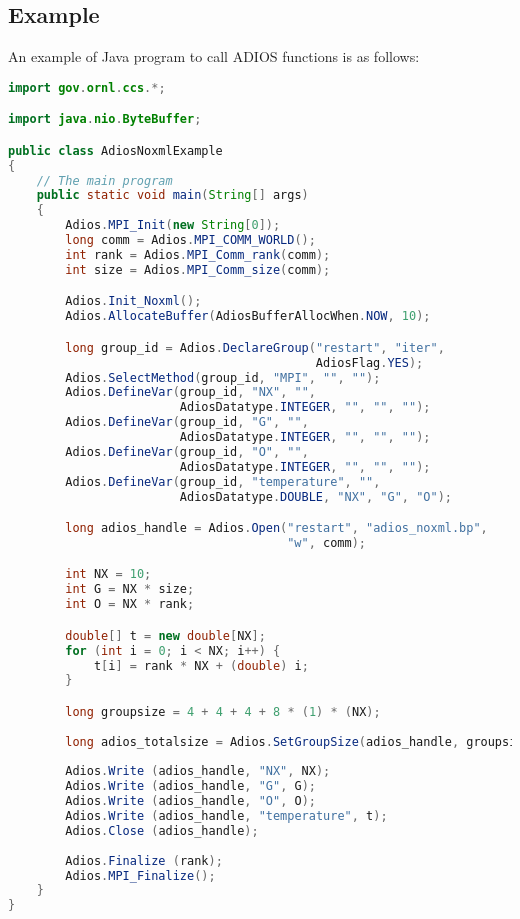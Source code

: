 \subsection{Example}
An example of Java program to call ADIOS functions is as follows:
\begin{lstlisting}[language=Java,frame=single, backgroundcolor=\color{gray85},caption={Example Java wrapper code},label={}]
import gov.ornl.ccs.*;

import java.nio.ByteBuffer;

public class AdiosNoxmlExample
{
    // The main program
    public static void main(String[] args)
    {
        Adios.MPI_Init(new String[0]);
        long comm = Adios.MPI_COMM_WORLD();
        int rank = Adios.MPI_Comm_rank(comm);
        int size = Adios.MPI_Comm_size(comm);

        Adios.Init_Noxml();
        Adios.AllocateBuffer(AdiosBufferAllocWhen.NOW, 10);

        long group_id = Adios.DeclareGroup("restart", "iter", 
                                           AdiosFlag.YES);
        Adios.SelectMethod(group_id, "MPI", "", "");
        Adios.DefineVar(group_id, "NX", "", 
                        AdiosDatatype.INTEGER, "", "", "");
        Adios.DefineVar(group_id, "G", "", 
                        AdiosDatatype.INTEGER, "", "", "");
        Adios.DefineVar(group_id, "O", "", 
                        AdiosDatatype.INTEGER, "", "", "");
        Adios.DefineVar(group_id, "temperature", "", 
                        AdiosDatatype.DOUBLE, "NX", "G", "O");

        long adios_handle = Adios.Open("restart", "adios_noxml.bp", 
                                       "w", comm);

        int NX = 10; 
        int G = NX * size;
        int O = NX * rank;

        double[] t = new double[NX];
        for (int i = 0; i < NX; i++) {
            t[i] = rank * NX + (double) i;
        }

        long groupsize = 4 + 4 + 4 + 8 * (1) * (NX);
        
        long adios_totalsize = Adios.SetGroupSize(adios_handle, groupsize);
        
        Adios.Write (adios_handle, "NX", NX);
        Adios.Write (adios_handle, "G", G);
        Adios.Write (adios_handle, "O", O);
        Adios.Write (adios_handle, "temperature", t);
        Adios.Close (adios_handle);
        
        Adios.Finalize (rank);        
        Adios.MPI_Finalize();
    }
}
\end{lstlisting}

